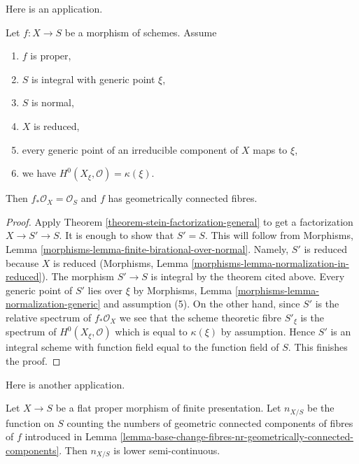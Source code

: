 \noindent
Here is an application.

\begin{lemma}
\label{lemma-geometrically-connected-fibres-towards-normal}
Let $f : X \to S$ be a morphism of schemes. Assume
\begin{enumerate}
\item $f$ is proper,
\item $S$ is integral with generic point $\xi$,
\item $S$ is normal,
\item $X$ is reduced,
\item every generic point of an irreducible component of $X$ maps to $\xi$,
\item we have $H^0(X_\xi, \mathcal{O}) = \kappa(\xi)$.
\end{enumerate}
Then $f_*\mathcal{O}_X = \mathcal{O}_S$ and $f$
has geometrically connected fibres.
\end{lemma}

\begin{proof}
Apply Theorem \ref{theorem-stein-factorization-general} to get a
factorization $X \to S' \to S$. It is enough to show that $S' = S$.
This will follow from Morphisms, Lemma
\ref{morphisms-lemma-finite-birational-over-normal}.
Namely, $S'$ is reduced because $X$ is reduced
(Morphisms, Lemma \ref{morphisms-lemma-normalization-in-reduced}).
The morphism $S' \to S$ is integral by the theorem cited above.
Every generic point of $S'$ lies over $\xi$ by
Morphisms, Lemma \ref{morphisms-lemma-normalization-generic}
and assumption (5). On the other hand, since $S'$ is the relative
spectrum of $f_*\mathcal{O}_X$ we see that the scheme theoretic fibre
$S'_\xi$ is the spectrum of $H^0(X_\xi, \mathcal{O})$ which is
equal to $\kappa(\xi)$ by assumption. Hence $S'$ is an integral
scheme with function field equal to the function field of $S$.
This finishes the proof.
\end{proof}

\noindent
Here is another application.

\begin{lemma}
\label{lemma-proper-flat-nr-geom-conn-comps-lower-semicontinuous}
Let $X \to S$ be a flat proper morphism of finite presentation. Let
$n_{X/S}$ be the function on $S$ counting the numbers of geometric
connected components of fibres of $f$ introduced in
Lemma \ref{lemma-base-change-fibres-nr-geometrically-connected-components}.
Then $n_{X/S}$ is lower semi-continuous.
\end{lemma}

